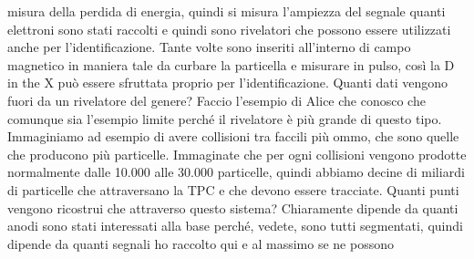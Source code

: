 {misura della perdida di energia, quindi si misura l'ampiezza del segnale quanti elettroni sono stati raccolti e quindi sono rivelatori che possono essere utilizzati anche per l'identificazione. Tante volte sono inseriti all'interno di campo magnetico in maniera tale da curbare la particella e misurare in pulso, così la D in the X può essere sfruttata proprio per l'identificazione. Quanti dati vengono fuori da un rivelatore del genere? Faccio l'esempio di Alice che conosco che comunque sia l'esempio limite perché il rivelatore è più grande di questo tipo. Immaginiamo ad esempio di avere collisioni tra faccili più ommo, che sono quelle che producono più particelle. Immaginate che per ogni collisioni vengono prodotte normalmente dalle 10.000 alle 30.000 particelle, quindi abbiamo decine di miliardi di particelle che attraversano la TPC e che devono essere tracciate. Quanti punti vengono ricostrui che attraverso questo sistema? Chiaramente dipende da quanti anodi sono stati interessati alla base perché, vedete, sono tutti segmentati, quindi dipende da quanti segnali ho raccolto qui e al massimo se ne possono 

}
